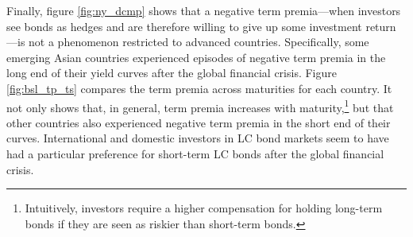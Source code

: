 {Finally, figure \ref{fig:ny_dcmp} shows that a negative term premia---when investors see bonds as hedges and are therefore willing to give up some investment return---is not a phenomenon restricted to advanced countries.
Specifically, some emerging Asian countries experienced episodes of negative term premia in the long end of their yield curves after the global financial crisis.
Figure \ref{fig:bsl_tp_ts} compares the term premia across maturities for each country.
It not only shows that, in general, term premia increases with maturity,\footnote{ Intuitively, investors require a higher compensation for holding long-term bonds if they are seen as riskier than short-term bonds.} but that other countries also experienced negative term premia in the short end of their curves. %
International and domestic investors in LC bond markets seem to have had a particular preference for short-term LC bonds after the global financial crisis.

}

